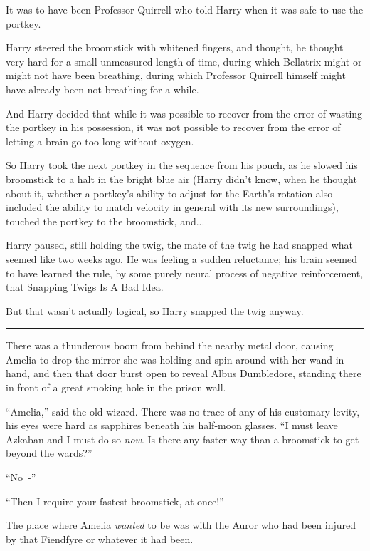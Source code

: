 It was to have been Professor Quirrell who told Harry when it was safe to use the portkey.

Harry steered the broomstick with whitened fingers, and thought, he thought very hard for a small unmeasured length of time, during which Bellatrix might or might not have been breathing, during which Professor Quirrell himself might have already been not-breathing for a while.

And Harry decided that while it was possible to recover from the error of wasting the portkey in his possession, it was not possible to recover from the error of letting a brain go too long without oxygen.

So Harry took the next portkey in the sequence from his pouch, as he slowed his broomstick to a halt in the bright blue air (Harry didn't know, when he thought about it, whether a portkey's ability to adjust for the Earth's rotation also included the ability to match velocity in general with its new surroundings), touched the portkey to the broomstick, and...

Harry paused, still holding the twig, the mate of the twig he had snapped what seemed like two weeks ago. He was feeling a sudden reluctance; his brain seemed to have learned the rule, by some purely neural process of negative reinforcement, that Snapping Twigs Is A Bad Idea.

But that wasn't actually logical, so Harry snapped the twig anyway.

\begin{center}\rule{3in}{0.4pt}\end{center}

There was a thunderous boom from behind the nearby metal door, causing Amelia to drop the mirror she was holding and spin around with her wand in hand, and then that door burst open to reveal Albus Dumbledore, standing there in front of a great smoking hole in the prison wall.

``Amelia,'' said the old wizard. There was no trace of any of his customary levity, his eyes were hard as sapphires beneath his half-moon glasses. ``I must leave Azkaban and I must do so \emph{now}. Is there any faster way than a broomstick to get beyond the wards?''

``No~-''

``Then I require your fastest broomstick, at once!''

The place where Amelia \emph{wanted} to be was with the Auror who had been injured by that Fiendfyre or whatever it had been.

